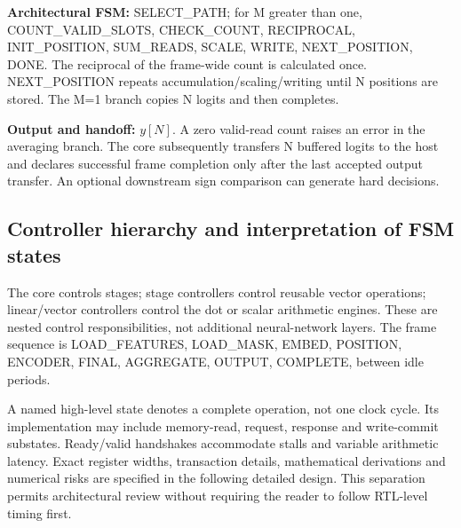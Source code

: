 \textbf{Architectural FSM:} SELECT\_PATH; for M greater than one, COUNT\_VALID\_SLOTS, CHECK\_COUNT, RECIPROCAL, INIT\_POSITION, SUM\_READS, SCALE, WRITE, NEXT\_POSITION, DONE. The reciprocal of the frame-wide count is calculated once. NEXT\_POSITION repeats accumulation/scaling/writing until N positions are stored. The M=1 branch copies N logits and then completes.

\textbf{Output and handoff:} $y[N]$. A zero valid-read count raises an error in the averaging branch. The core subsequently transfers N buffered logits to the host and declares successful frame completion only after the last accepted output transfer. An optional downstream sign comparison can generate hard decisions.

\subsection{Controller hierarchy and interpretation of FSM states}
The core controls stages; stage controllers control reusable vector operations; linear/vector controllers control the dot or scalar arithmetic engines. These are nested control responsibilities, not additional neural-network layers. The frame sequence is LOAD\_FEATURES, LOAD\_MASK, EMBED, POSITION, ENCODER, FINAL, AGGREGATE, OUTPUT, COMPLETE, between idle periods.

A named high-level state denotes a complete operation, not one clock cycle. Its implementation may include memory-read, request, response and write-commit substates. Ready/valid handshakes accommodate stalls and variable arithmetic latency. Exact register widths, transaction details, mathematical derivations and numerical risks are specified in the following detailed design. This separation permits architectural review without requiring the reader to follow RTL-level timing first.

